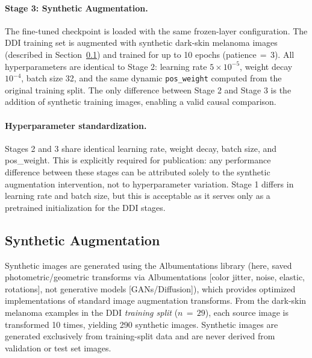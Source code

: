 \paragraph{Stage 3: Synthetic Augmentation.}
The fine-tuned checkpoint is loaded with the same frozen-layer configuration. The DDI training set is augmented with synthetic dark-skin melanoma images (described in Section~\ref{sec:synthetic_aug}) and trained for up to 10 epochs (patience\,$=$\,3). All hyperparameters are identical to Stage 2: learning rate $5 \times 10^{-5}$, weight decay $10^{-4}$, batch size 32, and the same dynamic \texttt{pos\_weight} computed from the original training split. The only difference between Stage 2 and Stage 3 is the addition of synthetic training images, enabling a valid causal comparison.

\paragraph{Hyperparameter standardization.}
Stages 2 and 3 share identical learning rate, weight decay, batch size, and pos\_weight. This is explicitly required for publication: any performance difference between these stages can be attributed solely to the synthetic augmentation intervention, not to hyperparameter variation. Stage 1 differs in learning rate and batch size, but this is acceptable as it serves only as a pretrained initialization for the DDI stages.

\subsection{Synthetic Augmentation}
\label{sec:synthetic_aug}

Synthetic images are generated using the Albumentations library \cite{Buslaev2020} (here, saved photometric/geometric transforms via Albumentations [color jitter, noise, elastic, rotations], not generative models [GANs/Diffusion]), which provides optimized implementations of standard image augmentation transforms. From the dark-skin melanoma examples in the DDI \emph{training split} ($n\,{=}\,29$), each source image is transformed 10 times, yielding 290 synthetic images. Synthetic images are generated exclusively from training-split data and are never derived from validation or test set images.

